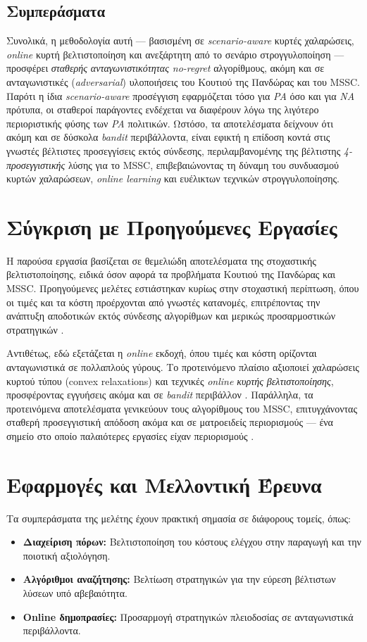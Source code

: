 \documentclass[11pt,a4paper]{article}
\begin{document}
\subsection*{Συμπεράσματα}
Συνολικά, η μεθοδολογία αυτή — βασισμένη σε \textit{scenario-aware} κυρτές χαλαρώσεις, \textit{online} κυρτή βελτιστοποίηση και ανεξάρτητη από το σενάριο στρογγυλοποίηση — προσφέρει \textit{σταθερής ανταγωνιστικότητας no-regret} αλγορίθμους, ακόμη και σε ανταγωνιστικές (\textit{adversarial}) υλοποιήσεις του Κουτιού της Πανδώρας και του MSSC. Παρότι η ίδια \textit{scenario-aware} προσέγγιση εφαρμόζεται τόσο για \textit{PA} όσο και για \textit{NA} πρότυπα, οι σταθεροί παράγοντες ενδέχεται να διαφέρουν λόγω της λιγότερο περιοριστικής φύσης των \textit{PA} πολιτικών. Ωστόσο, τα αποτελέσματα δείχνουν ότι ακόμη και σε δύσκολα \textit{bandit} περιβάλλοντα, είναι εφικτή η επίδοση κοντά στις γνωστές βέλτιστες προσεγγίσεις εκτός σύνδεσης, περιλαμβανομένης της βέλτιστης \textit{4-προσεγγιστικής} λύσης για το MSSC, επιβεβαιώνοντας τη δύναμη του συνδυασμού κυρτών χαλαρώσεων, \textit{online learning} και ευέλικτων τεχνικών στρογγυλοποίησης.

\section{Σύγκριση με Προηγούμενες Εργασίες}
Η παρούσα εργασία βασίζεται σε θεμελιώδη αποτελέσματα της στοχαστικής βελτιστοποίησης, ειδικά όσον αφορά τα προβλήματα Κουτιού της Πανδώρας και MSSC. Προηγούμενες μελέτες εστιάστηκαν κυρίως στην στοχαστική περίπτωση, όπου οι τιμές και τα κόστη προέρχονται από γνωστές κατανομές, επιτρέποντας την ανάπτυξη αποδοτικών εκτός σύνδεσης αλγορίθμων και μερικώς προσαρμοστικών στρατηγικών \cite{weitzman1978optimal, chawla2020pandora}.

Αντιθέτως, εδώ εξετάζεται η \textit{online} εκδοχή, όπου τιμές και κόστη ορίζονται ανταγωνιστικά σε πολλαπλούς γύρους. Το προτεινόμενο πλαίσιο αξιοποιεί χαλαρώσεις κυρτού τύπου (convex relaxations) και τεχνικές \textit{online κυρτής βελτιστοποίησης}, προσφέροντας εγγυήσεις ακόμα και σε \textit{bandit} περιβάλλον \cite{gergatsouli2022online}. Παράλληλα, τα προτεινόμενα αποτελέσματα γενικεύουν τους αλγορίθμους του MSSC, επιτυγχάνοντας σταθερή προσεγγιστική απόδοση ακόμα και σε ματροειδείς περιορισμούς — ένα σημείο στο οποίο παλαιότερες εργασίες είχαν περιορισμούς \cite{feige2004approximating}.

\section{Εφαρμογές και Μελλοντική Έρευνα}
Τα συμπεράσματα της μελέτης έχουν πρακτική σημασία σε διάφορους τομείς, όπως:
\begin{itemize}
    \item \textbf{Διαχείριση πόρων:} Βελτιστοποίηση του κόστους ελέγχου στην παραγωγή και την ποιοτική αξιολόγηση.
    \item \textbf{Αλγόριθμοι αναζήτησης:} Βελτίωση στρατηγικών για την εύρεση βέλτιστων λύσεων υπό αβεβαιότητα.
    \item \textbf{Online δημοπρασίες:} Προσαρμογή στρατηγικών πλειοδοσίας σε ανταγωνιστικά περιβάλλοντα.
\end{itemize}
\end{document}
